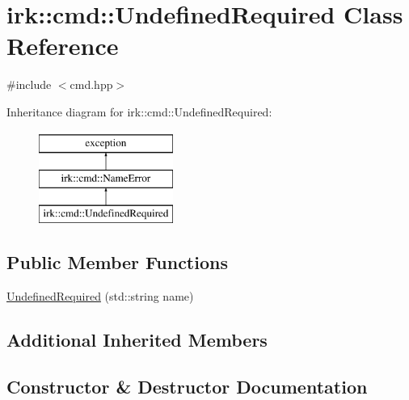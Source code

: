 \hypertarget{classirk_1_1cmd_1_1UndefinedRequired}{}\section{irk\+:\+:cmd\+:\+:Undefined\+Required Class Reference}
\label{classirk_1_1cmd_1_1UndefinedRequired}


{\ttfamily \#include $<$cmd.\+hpp$>$}

Inheritance diagram for irk\+:\+:cmd\+:\+:Undefined\+Required\+:\begin{figure}[H]
\begin{center}
\leavevmode
\includegraphics[height=3.000000cm]{classirk_1_1cmd_1_1UndefinedRequired}
\end{center}
\end{figure}
\subsection*{Public Member Functions}
\begin{DoxyCompactItemize}
\item 
\mbox{\hyperlink{classirk_1_1cmd_1_1UndefinedRequired_a3f6d37814e4362a20b2d87a108266534}{Undefined\+Required}} (std\+::string name)
\end{DoxyCompactItemize}
\subsection*{Additional Inherited Members}


\subsection{Constructor \& Destructor Documentation}
\mbox{\label{classirk_1_1cmd_1_1UndefinedRequired_a3f6d37814e4362a20b2d87a108266534}} 
